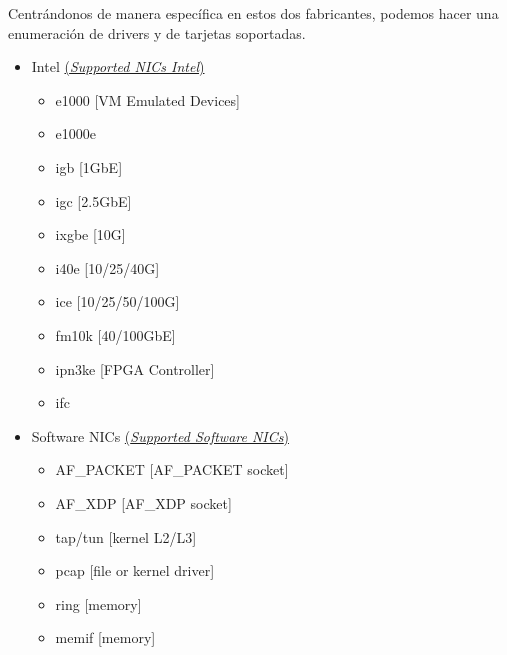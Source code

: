 \documentclass[12pt]{article}
\begin{document}
	 \noindent Centrándonos de manera específica en estos dos fabricantes, podemos hacer una enumeración de drivers y de tarjetas soportadas.
	 
	 \begin{itemize}
	 	\item Intel \hyperref[bib:link7]{(\textit{Supported NICs Intel})}
	 	\begin{multicols}{2}
	 		\begin{itemize}
	 			\item e1000 [VM Emulated Devices]
	 			
	 			\item e1000e 
	 			
	 			\item igb [1GbE]
	 			
	 			\item igc [2.5GbE]
	 			
	 			\item ixgbe [10G]
	 			
	 			\item i40e [10/25/40G]
	 			
	 			\item ice [10/25/50/100G]
	 			
	 			\item fm10k [40/100GbE]
	 			
	 			\item ipn3ke [FPGA Controller]
	 			
	 			\item ifc
	 		\end{itemize}
	 	\end{multicols}
	 	
	 	\item Software NICs \hyperref[bib:link8]{(\textit{Supported Software NICs})}
	 	\begin{multicols}{2}
	 		\begin{itemize}
	 			\item AF\_PACKET [AF\_PACKET socket]
	 			
	 			\item AF\_XDP [AF\_XDP socket]
	 			
	 			\item tap/tun [kernel L2/L3]
	 			
	 			\item pcap [file or kernel driver]
	 			
	 			\item ring [memory]
	 			
	 			\item memif [memory]
	 		\end{itemize}
	 	\end{multicols}
	 \end{itemize}
    
\end{document}

